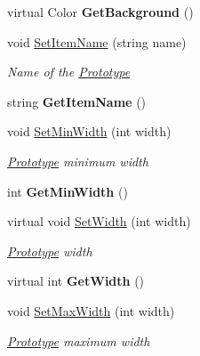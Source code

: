 \begin{DoxyCompactItemize}
virtual Color {\bfseries Get\+Background} ()
\item 
void \mbox{\hyperlink{class_space_v_i_l_1_1_prototype_aa4827992b9c7a63aebec49322a7b862f}{Set\+Item\+Name}} (string name)
\begin{DoxyCompactList}\small\item\em Name of the \mbox{\hyperlink{class_space_v_i_l_1_1_prototype}{Prototype}} \end{DoxyCompactList}\item 
\mbox{\label{class_space_v_i_l_1_1_prototype_a490ea197ee9b8e5149e9026290df980d}} 
string {\bfseries Get\+Item\+Name} ()
\item 
void \mbox{\hyperlink{class_space_v_i_l_1_1_prototype_a9594f8484683ec450e8ce20b0c5fad1c}{Set\+Min\+Width}} (int width)
\begin{DoxyCompactList}\small\item\em \mbox{\hyperlink{class_space_v_i_l_1_1_prototype}{Prototype}} minimum width \end{DoxyCompactList}\item 
\mbox{\label{class_space_v_i_l_1_1_prototype_ab35e60e5273dfae718f0ea29498e15c6}} 
int {\bfseries Get\+Min\+Width} ()
\item 
virtual void \mbox{\hyperlink{class_space_v_i_l_1_1_prototype_a6a4f1b9581f4d18f1c3a3e287d4b2a2b}{Set\+Width}} (int width)
\begin{DoxyCompactList}\small\item\em \mbox{\hyperlink{class_space_v_i_l_1_1_prototype}{Prototype}} width \end{DoxyCompactList}\item 
\mbox{\label{class_space_v_i_l_1_1_prototype_aafff1961c4b80b3745410834d6cc2e88}} 
virtual int {\bfseries Get\+Width} ()
\item 
void \mbox{\hyperlink{class_space_v_i_l_1_1_prototype_afb5b3eade68537c29e07b3da28782e96}{Set\+Max\+Width}} (int width)
\begin{DoxyCompactList}\small\item\em \mbox{\hyperlink{class_space_v_i_l_1_1_prototype}{Prototype}} maximum width \end{DoxyCompactList}\item 
\mbox{\label{class_space_v_i_l_1_1_prototype_abf5bdd0bdf98b0232eae65f1b34a2ac8}} 

\end{DoxyCompactItemize}
